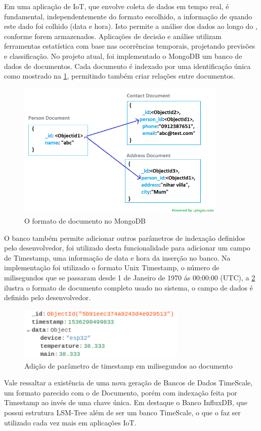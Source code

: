 Em uma aplicação de IoT, que envolve coleta de dados em tempo real, é fundamental, independentemente do formato escolhido, a informação de quando este dado foi colhido (data e hora). Isto permite a análise dos dados ao longo do , conforme forem armazenados. Aplicações de decisão e análise utilizam ferramentas estatística com base nas ocorrências temporais, projetando previsões e classificação. No projeto atual, foi implementado o MongoDB um banco de dados de documentos. Cada documento é indexado por uma identificação única como mostrado na \ref{fig:document-model}, permitindo também criar relações entre documentos.

\begin{figure}[h!]
\centering
\includegraphics[width=10cm]{./02_Capitulos/02_Cap3/figures/document-model}
\caption{O formato de documento no MongoDB}
\label{fig:document-model}
\end{figure}

O banco também permite adicionar outros parâmetros de indexação definidos pelo desenvolvedor, foi utilizado desta funcionalidade para adicionar um campo de Timestamp, uma informação de data e hora da inserção no banco. Na implementação foi utilizado o formato Unix Timestamp, o número de milisegundos que se passaram desde 1 de Janeiro de 1970 ás 00:00:00 (UTC), a \ref{fig:document-timestamp} ilustra o formato de documento completo usado no sistema, o campo de dados é definido pelo desenvolvedor. 

\begin{figure}[h!]
\centering
\includegraphics[width=8cm]{./02_Capitulos/02_Cap3/figures/document-timestamp}
\caption{Adição de parâmetro de timestamp em milisegundos ao documento}
\label{fig:document-timestamp}
\end{figure}

Vale ressaltar a existência de uma nova geração de Bancos de Dados TimeScale, um formato parecido com o de Documento, porém com indexação feita por Timestamp ao invés de uma chave única. Em destaque o Banco InfluxDB, que possui estrutura LSM-Tree além de ser um banco TimeScale, o que o faz ser utilizado cada vez mais em aplicações IoT.
